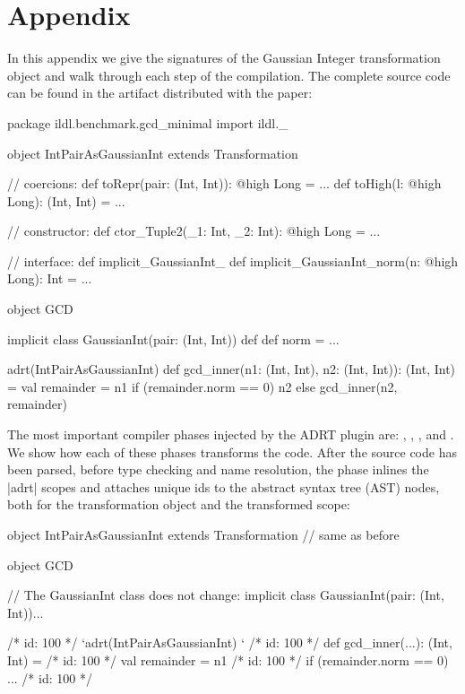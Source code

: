 \section*{Appendix}

In this appendix we give the signatures of the Gaussian Integer transformation object and walk through each step of the compilation. The complete source code can be found in the artifact distributed with the paper:

\begin{lstlisting-nobreak}
package ildl.benchmark.gcd_minimal
import ildl._

object IntPairAsGaussianInt extends Transformation{
  // coercions:
  def toRepr(pair: (Int, Int)): @high Long = ...
  def toHigh(l: @high Long): (Int, Int) = ...

  // constructor:
  def ctor_Tuple2(_1: Int, _2: Int): @high Long = ...

  // interface:
  def implicit_GaussianInt_%
  def implicit_GaussianInt_norm(n: @high Long): Int = ...
}

object GCD {
  implicit class GaussianInt(pair: (Int, Int)) {
    def %
    def norm = ...
  }

  adrt(IntPairAsGaussianInt) {
    def gcd_inner(n1: (Int, Int), n2: (Int, Int)): (Int, Int) = {
      val remainder = n1 %
      if (remainder.norm == 0) n2 else gcd_inner(n2, remainder)
    }
  }
}
\end{lstlisting-nobreak}

The most important compiler phases injected by the ADRT plugin are: \postparser{}, \inject{}, \bridge{}, \coerce{} and \commit{}. We show how each of these phases transforms the code. After the source code has been parsed, before type checking and name resolution, the \postparser{} phase inlines the |adrt| scopes and attaches unique ids to the abstract syntax tree (AST) nodes, both for the transformation object and the transformed scope:

\begin{lstlisting-nobreak}
object IntPairAsGaussianInt extends Transformation{
  // same as before
}

object GCD {
  // The GaussianInt class does not change:
  implicit class GaussianInt(pair: (Int, Int))...

  /* id: 100 */ `adrt(IntPairAsGaussianInt) {}`
  /* id: 100 */ def gcd_inner(...): (Int, Int) = {
  /* id: 100 */        val remainder = n1 %
  /* id: 100 */        if (remainder.norm == 0) ...
  /* id: 100 */ }
}
\end{lstlisting-nobreak}

